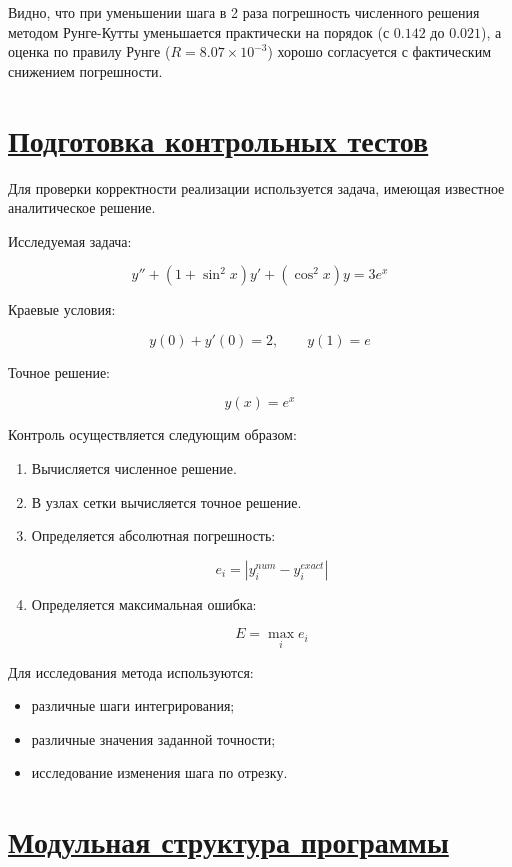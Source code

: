 \documentclass[14pt]{extarticle}
\begin{document}
	Видно, что при уменьшении шага в 2 раза погрешность численного решения методом Рунге-Кутты уменьшается практически на порядок (с $0.142$ до $0.021$), а оценка по правилу Рунге ($R = 8.07 \times 10^{-3}$) хорошо согласуется с фактическим снижением погрешности.
	
	
	\newpage
	\section{\Large \underline{Подготовка контрольных тестов}}
	
	Для проверки корректности реализации используется задача,
	имеющая известное аналитическое решение.
	
	Исследуемая задача:
	
	\[
	y'' + (1 + \sin^2 x)y' + (\cos^2 x)y = 3e^x
	\]
	
	Краевые условия:
	
	\[
	y(0) + y'(0) = 2, \qquad y(1) = e
	\]
	
	Точное решение:
	
	\[
	y(x) = e^x
	\]
	
	Контроль осуществляется следующим образом:
	
	\begin{enumerate}
		\item Вычисляется численное решение.
		\item В узлах сетки вычисляется точное решение.
		\item Определяется абсолютная погрешность:
		
		\[
		e_i = |y_i^{num} - y_i^{exact}|
		\]
		
		\item Определяется максимальная ошибка:
		
		\[
		E = \max_i e_i
		\]
	\end{enumerate}
	
	Для исследования метода используются:
	
	\begin{itemize}
		\item различные шаги интегрирования;
		\item различные значения заданной точности;
		\item исследование изменения шага по отрезку.
	\end{itemize}
	
	
	\section{\Large \underline{Модульная структура программы}}
	
\end{document}

